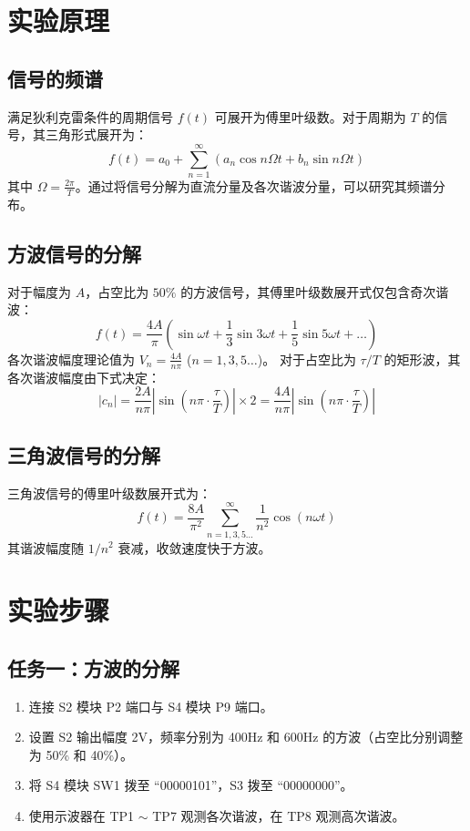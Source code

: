 \documentclass[12pt, a4paper]{ctexrep}
\begin{document}
\section{实验原理}
\subsection{信号的频谱}
满足狄利克雷条件的周期信号 $f(t)$ 可展开为傅里叶级数。对于周期为 $T$ 的信号，其三角形式展开为：
\begin{equation}
    f(t) = a_0 + \sum_{n=1}^{\infty} (a_n \cos n\Omega t + b_n \sin n\Omega t)
\end{equation}
其中 $\Omega = \frac{2\pi}{T}$。通过将信号分解为直流分量及各次谐波分量，可以研究其频谱分布。
\subsection{方波信号的分解}
对于幅度为 $A$，占空比为 $50\%$ 的方波信号，其傅里叶级数展开式仅包含奇次谐波：
\begin{equation}
    f(t) = \frac{4A}{\pi} \left( \sin \omega t + \frac{1}{3} \sin 3\omega t + \frac{1}{5} \sin 5\omega t + \dots \right)
\end{equation}
各次谐波幅度理论值为 $V_n = \frac{4A}{n\pi}$ ($n=1,3,5\dots$)。
对于占空比为 $\tau/T$ 的矩形波，其各次谐波幅度由下式决定：
\begin{equation}
    |c_n| = \frac{2A}{n\pi} |\sin(n\pi \cdot \frac{\tau}{T})| \times 2 = \frac{4A}{n\pi} |\sin(n\pi \cdot \frac{\tau}{T})|
\end{equation}

\subsection{三角波信号的分解}
三角波信号的傅里叶级数展开式为：
\begin{equation}
    f(t) = \frac{8A}{\pi^2} \sum_{n=1,3,5\dots}^{\infty} \frac{1}{n^2} \cos(n\omega t)
\end{equation}
其谐波幅度随 $1/n^2$ 衰减，收敛速度快于方波。
\section{实验步骤}
\subsection{任务一：方波的分解}
\begin{enumerate}
    \item 连接 S2 模块 P2 端口与 S4 模块 P9 端口。
    \item 设置 S2 输出幅度 2V，频率分别为 400Hz 和 600Hz 的方波（占空比分别调整为 50\% 和 40\%）。
    \item 将 S4 模块 SW1 拨至 ``00000101''，S3 拨至 ``00000000''。
    \item 使用示波器在 TP1 $\sim$ TP7 观测各次谐波，在 TP8 观测高次谐波。
\end{enumerate}
\end{document}
